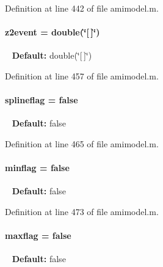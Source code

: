 Definition at line 442 of file amimodel.\+m.

\hypertarget{classamimodel_a7a7be015feeb7a346dceccd49e622b4b}{}
\paragraph[{z2event}]{\setlength{\rightskip}{0pt plus 5cm}z2event = double(\char`\"{}\mbox{[}$\,$\mbox{]}\char`\"{})}\label{classamimodel_a7a7be015feeb7a346dceccd49e622b4b}
~\newline
{\bfseries Default\+:} double(\char`\"{}\mbox{[}$\,$\mbox{]}\char`\"{}) 

Definition at line 457 of file amimodel.\+m.

\hypertarget{classamimodel_abea45d67286ebbf35dcbc12e335ffd51}{}
\paragraph[{splineflag}]{\setlength{\rightskip}{0pt plus 5cm}splineflag = false}\label{classamimodel_abea45d67286ebbf35dcbc12e335ffd51}
~\newline
{\bfseries Default\+:} false 

Definition at line 465 of file amimodel.\+m.

\hypertarget{classamimodel_affead4b7a87bc135fea91fd5aada78a8}{}
\paragraph[{minflag}]{\setlength{\rightskip}{0pt plus 5cm}minflag = false}\label{classamimodel_affead4b7a87bc135fea91fd5aada78a8}
~\newline
{\bfseries Default\+:} false 

Definition at line 473 of file amimodel.\+m.

\hypertarget{classamimodel_a1a65e7157ae2262cfa11a783b018364f}{}
\paragraph[{maxflag}]{\setlength{\rightskip}{0pt plus 5cm}maxflag = false}\label{classamimodel_a1a65e7157ae2262cfa11a783b018364f}
~\newline
{\bfseries Default\+:} false 

